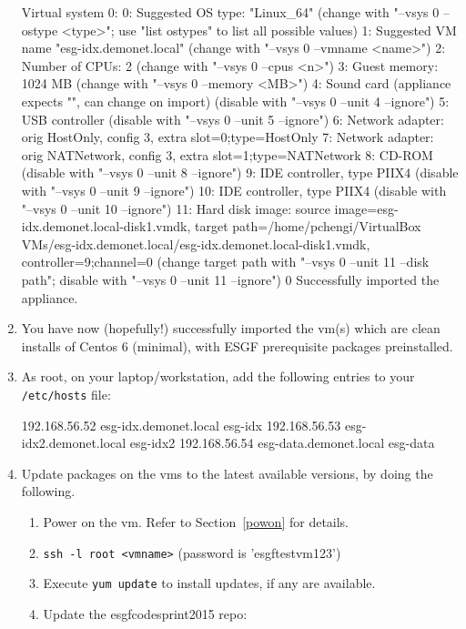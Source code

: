 \begin{enumerate}
\begin{tiny}
\begin{verbatimtab}[4]
Virtual system 0:
 0: Suggested OS type: "Linux_64"
    (change with "--vsys 0 --ostype <type>"; use "list ostypes" to list all possible values)
 1: Suggested VM name "esg-idx.demonet.local"
    (change with "--vsys 0 --vmname <name>")
 2: Number of CPUs: 2
    (change with "--vsys 0 --cpus <n>")
 3: Guest memory: 1024 MB
    (change with "--vsys 0 --memory <MB>")
 4: Sound card (appliance expects "", can change on import)
    (disable with "--vsys 0 --unit 4 --ignore")
 5: USB controller
    (disable with "--vsys 0 --unit 5 --ignore")
 6: Network adapter: orig HostOnly, config 3, extra slot=0;type=HostOnly
 7: Network adapter: orig NATNetwork, config 3, extra slot=1;type=NATNetwork
 8: CD-ROM
    (disable with "--vsys 0 --unit 8 --ignore")
 9: IDE controller, type PIIX4
    (disable with "--vsys 0 --unit 9 --ignore")
10: IDE controller, type PIIX4
    (disable with "--vsys 0 --unit 10 --ignore")
11: Hard disk image: source image=esg-idx.demonet.local-disk1.vmdk, 
target path=/home/pchengi/VirtualBox VMs/esg-idx.demonet.local/esg-idx.demonet.local-disk1.vmdk, 
controller=9;channel=0
    (change target path with "--vsys 0 --unit 11 --disk path";
    disable with "--vsys 0 --unit 11 --ignore")
0%
Successfully imported the appliance.
\end{verbatimtab}
\end{tiny}
\item You have now (hopefully!) successfully imported the vm(s) which are clean installs of Centos 6 (minimal), with ESGF prerequisite packages preinstalled.
\item As root, on your laptop/workstation, add the following entries to your \texttt{/etc/hosts} file:
\begin{verbatimtab}[4]
192.168.56.52   esg-idx.demonet.local   esg-idx
192.168.56.53   esg-idx2.demonet.local  esg-idx2
192.168.56.54   esg-data.demonet.local   esg-data
\end{verbatimtab}
\item Update packages on the vms to the latest available versions, by doing the following.
\begin{enumerate}
\item Power on the vm. Refer to Section~\ref{powon} for details.
\item \texttt{ssh -l root <vmname>} (password is 'esgftestvm123')
\item Execute  \texttt{yum update} to install updates, if any are available.
\item Update the esgfcodesprint2015 repo:\\

\end{enumerate}
\end{enumerate}
